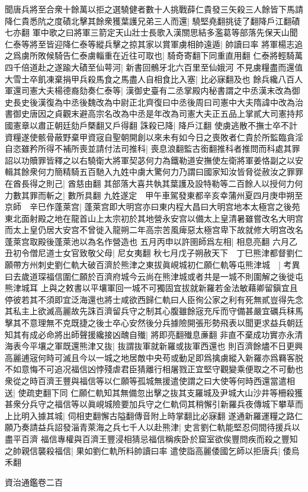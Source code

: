 聞唐兵將至合衆十餘萬以拒之選驍健者數十人挑戰薛仁貴發三矢殺三人餘皆下馬請降仁貴悉阬之度磧北擊其餘衆獲葉護兄弟三人而還|{
	驍堅堯翻挑徒了翻降戶江翻磧七亦翻}
軍中歌之曰將軍三箭定天山壯士長歌入漢關思結多濫葛等部落先保天山聞仁泰等將至皆迎降仁泰等縱兵擊之掠其家以賞軍虜相帥遠遁|{
	帥讀曰率}
將軍楊志追之爲虜所敗候騎告仁泰虜輜重在近往可取也|{
	騎奇寄翻下同重直用翻}
仁泰將輕騎萬四千倍道赴之遂踰大磧至仙萼河|{
	新書回鶻牙北六百里至仙娥河}
不見虜糧盡而還值大雪士卒飢凍棄捐甲兵殺馬食之馬盡人自相食比入塞|{
	比必寐翻及也}
餘兵纔八百人軍還司憲大夫楊德裔劾奏仁泰等|{
	漢御史臺有二丞掌殿内秘書謂之中丞漢末改為御史長史後漢復為中丞後魏改為中尉正北齊復曰中丞後周曰司憲中大夫隋諱中改為治書御史唐因之貞觀末避高宗名改為中丞是年改為司憲大夫正五品上掌貳大司憲持邦國憲章以肅正朝廷劾戶槩翻又戶得翻}
誅殺已降|{
	降戶江翻}
使虜逃散不撫士卒不計資糧遂使骸骨蔽野棄甲資宼自聖朝開創以來未有如今日之喪敗者仁貴於所監臨貪淫自恣雖矜所得不補所喪並請付法司推科|{
	喪息浪翻監古銜翻推科者推問而科處其罪}
詔以功贖罪皆釋之以右驍衛大將軍契苾何力為鐵勒道安撫使左衛將軍姜恪副之以安輯其餘衆何力簡精騎五百馳入九姓中虜大驚何力乃謂曰國家知汝皆脅從赦汝之罪罪在酋長得之則己|{
	酋慈由翻}
其部落大喜共執其葉護及設特勒等二百餘人以授何力何力數其罪而斬之|{
	數所具翻}
九姓遂定　甲午車駕發東都辛亥幸蒲州夏四月庚申朔至京師　辛巳作蓬萊宫|{
	蓬萊宫即大明宫亦曰東内程大昌曰大明宫地本太極宫之後苑東北面射殿之地在龍首山上太宗初於其地營永安宫以備太上皇清暑雖嘗改名大明宫而太上皇仍居大安宫不曾徙入龍朔二年高宗苦風痺惡太極宫卑下故就修大明宫改名蓬萊宫取殿後蓬萊池以為名作營造也}
五月丙申以許圉師爲左相|{
	相息亮翻}
六月乙丑初令僧尼道士女官致敬父母|{
	尼女夷翻}
秋七月戊子朔赦天下　丁巳熊津都督劉仁願帶方州刺史劉仁軌大破百濟於熊津之東拔眞峴城初仁願仁軌等屯熊津城　|{
	考異曰去歲道琛福信圍仁願於百濟府城今云尚在熊津城或者共是一城不則圍解之後徙屯熊津城耳}
上與之敕書以平壤軍回一城不可獨固宜拔就新羅若金法敏藉卿留鎭宜且停彼若其不須即宜泛海還也將士咸欲西歸仁軌曰人臣徇公家之利有死無貳豈得先念其私主上欲滅高麗故先誅百濟留兵守之制其心腹雖餘宼充斥而守備甚嚴宜礪兵秣馬擊其不意理無不克既捷之後士卒心安然後分兵據險開張形勢飛表以聞更求益兵朝廷知其有成必命將出師聲援纔接凶醜自殱|{
	將即亮翻殱息亷翻}
非直不棄成功實亦永清海表今平壤之軍既還熊津又抜|{
	抜謂抜軍就新羅或抜軍西還也}
則百濟餘燼不日更興高麗逋宼何時可滅且今以一城之地居敵中央苟或動足即爲擒虜縱入新羅亦爲羇客脱不如意悔不可追况福信凶悖殘虐君臣猜離行相屠戮正宜堅守觀變乘便取之不可動也衆從之時百濟王豐與福信等以仁願等孤城無援遣使謂之曰大使等何時西還當遣相送|{
	使疏吏翻下同}
仁願仁軌知其無備忽出擊之抜其支羅城及尹城大山沙井等柵殺獲甚衆分兵守之福信等以眞峴城險要加兵守之仁軌伺其稍懈引新羅兵夜傳城下攀草而上比明入據其城|{
	伺相吏翻懈古隘翻傳音附上時掌翻比必寐翻}
遂通新羅運糧之路仁願乃奏請益兵詔發淄青萊海之兵七千人以赴熊津|{
	史言劉仁軌能堅忍伺間待援兵以盡平百濟}
福信專權與百濟王豐浸相猜忌福信稱疾卧於窟室欲俟豐問疾而殺之豐知之帥親信襲殺福信|{
	果如劉仁軌所料帥讀曰率}
遣使詣高麗倭國乞師以拒唐兵|{
	倭烏禾翻}


資治通鑑卷二百
